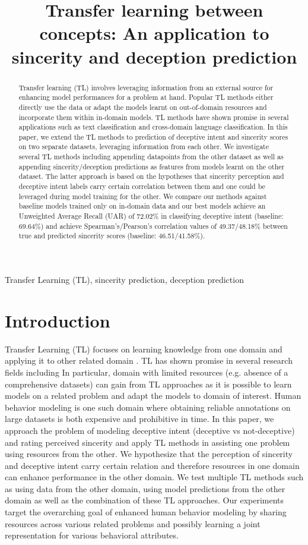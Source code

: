 \documentclass{article}
\title{Transfer learning between concepts: An application to sincerity and deception prediction}
\begin{document}
\ninept
%
\maketitle
%
\begin{abstract}
Transfer learning (TL) involves leveraging information from an external source for enhancing model performances for a problem at hand. 
Popular TL methods either directly use the data or adapt the models learnt on out-of-domain resources and incorporate them within in-domain models. 
TL methods have shown promise in several applications such as text classification and cross-domain language classification.
In this paper, we extend the TL methods to prediction of deceptive intent and sincerity scores on two separate datasets, leveraging information from each other.
We investigate several TL methods including appending datapoints from the other dataset as well as appending sincerity/deception predictions as features from models learnt on the other dataset. 
The latter approach is based on the hypotheses that sincerity perception and deceptive intent labels carry certain correlation between them and one could be leveraged during model training for the other. 
We compare our methods against baseline models trained only on in-domain data and our best models achieve an Unweighted Average Recall (UAR) of 72.02\% in classifying deceptive intent (baseline: 69.64\%) and achieve Spearman's/Pearson's correlation values of 49.37/48.18\% between true and predicted sincerity scores (baseline: 46.51/41.58\%).
 
\end{abstract}
%
\begin{keywords}
Transfer Learning (TL), sincerity prediction, deception prediction 
\end{keywords}
%
\section{Introduction}
\label{sec:intro}
Transfer Learning (TL) focuses on learning knowledge from one domain and applying it to other related domain \cite{}. 
TL has shown promise in several research fields including 
In particular, domain with limited resources (e.g. absence of a comprehensive datasets) can gain from TL approaches as it is possible to learn models on a related problem and adapt the models to domain of interest. 
Human behavior modeling \cite{} is one such domain where obtaining reliable annotations on large datasets is both expensive and prohibitive in time.
In this paper, we approach the problem of modeling deceptive intent (deceptive vs not-deceptive) and rating perceived sincerity and apply TL methods in assisting one problem using resources from the other. 
We hypothesize that the perception of sincerity and deceptive intent carry certain relation and therefore resources in one domain can enhance performance in the other domain.
We test multiple TL methods such as using data from the other domain, using model predictions from the other domain as well as the combination of these TL approaches. 
Our experiments target the overarching goal of enhanced human behavior modeling by sharing resources across various related problems and possibly learning a joint representation for various behavioral attributes. 
\end{document}
